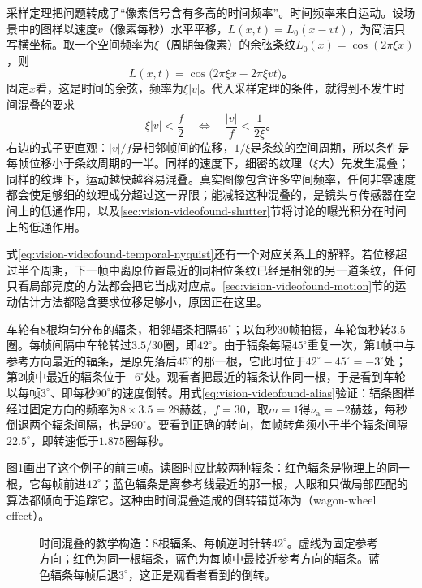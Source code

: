 采样定理把问题转成了“像素信号含有多高的时间频率”。时间频率来自运动。设场景中的图样以速度$v$（像素每秒）水平平移，$L(x,t)=L_0(x-vt)$，为简洁只写横坐标。取一个空间频率为$\xi$（周期每像素）的余弦条纹$L_0(x)=\cos(2\pi\xi x)$，则
\[
  L(x,t)=\cos\bigl(2\pi\xi x-2\pi\xi v t\bigr)\text{。}
\]
固定$x$看，这是时间的余弦，频率为$\xi|v|$。代入采样定理的条件，就得到不发生时间混叠的要求
\begin{equation}
  \xi|v|<\frac{f}{2}
  \quad\Longleftrightarrow\quad
  \frac{|v|}{f}<\frac{1}{2\xi}\text{。}
  \label{eq:vision-videofound-temporal-nyquist}
\end{equation}
右边的式子更直观：$|v|/f$是相邻帧间的位移，$1/\xi$是条纹的空间周期，所以条件是每帧位移小于条纹周期的一半。同样的速度下，细密的纹理（$\xi$大）先发生混叠；同样的纹理下，运动越快越容易混叠。真实图像包含许多空间频率，任何非零速度都会使足够细的纹理成分超过这一界限；能减轻这种混叠的，是镜头与传感器在空间上的低通作用，以及\ref{sec:vision-videofound-shutter}节将讨论的曝光积分在时间上的低通作用。

式\eqref{eq:vision-videofound-temporal-nyquist}还有一个对应关系上的解释。若位移超过半个周期，下一帧中离原位置最近的同相位条纹已经是相邻的另一道条纹，任何只看局部亮度的方法都会把它当成对应点。\ref{sec:vision-videofound-motion}节的运动估计方法都隐含要求位移足够小，原因正在这里。

\begin{example}[车轮倒转的计算]
  \label{ex:vision-videofound-wagon-wheel}
  车轮有8根均匀分布的辐条，相邻辐条相隔$45^\circ$；以每秒30帧拍摄，车轮每秒转3.5圈。每帧间隔中车轮转过$3.5/30$圈，即$42^\circ$。由于辐条每隔$45^\circ$重复一次，第1帧中与参考方向最近的辐条，是原先落后$45^\circ$的那一根，它此时位于$42^\circ-45^\circ=-3^\circ$处；第2帧中最近的辐条位于$-6^\circ$处。观看者把最近的辐条认作同一根，于是看到车轮以每帧$3^\circ$、即每秒$90^\circ$的速度倒转。用式\eqref{eq:vision-videofound-alias}验证：辐条图样经过固定方向的频率为$8\times3.5=28$赫兹，$f=30$，取$m=1$得$\nu_{\mathrm a}=-2$赫兹，每秒倒退两个辐条间隔，也是$90^\circ$。要看到正确的转向，每帧转角须小于半个辐条间隔$22.5^\circ$，即转速低于$1.875$圈每秒。
\end{example}

图\ref{fig:vision-videofound-temporal-aliasing}画出了这个例子的前三帧。读图时应比较两种辐条：红色辐条是物理上的同一根，它每帧前进$42^\circ$；蓝色辐条是离参考线最近的那一根，人眼和只做局部匹配的算法都倾向于追踪它。这种由时间混叠造成的倒转错觉称为（wagon-wheel effect）。

\begin{figure}[htbp]
  \centering
  
  \caption{时间混叠的教学构造：8根辐条、每帧逆时针转$42^\circ$。虚线为固定参考方向；红色为同一根辐条，蓝色为每帧中最接近参考方向的辐条。蓝色辐条每帧后退$3^\circ$，这正是观看者看到的倒转。}
  \label{fig:vision-videofound-temporal-aliasing}
\end{figure}

